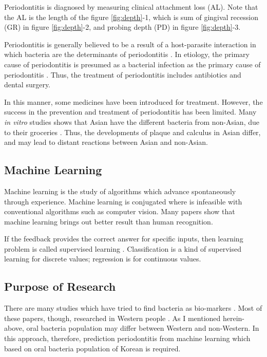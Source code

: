 \documentclass[aps, 11pt, a4paper]{article}
\begin{document}
    		Periodontitis is diagnosed by measuring clinical attachment loss (AL). Note that the AL is the length of the figure \ref{fig:depth}-1, which is sum of gingival recession (GR) in figure \ref{fig:depth}-2, and probing depth (PD) in figure \ref{fig:depth}-3.
    		
    		Periodontitis is generally believed to be a result of a host-parasite interaction in which bacteria are the determinants of periodontitis \cite{ref:cause1}. In etiology, the primary cause of periodontitis is presumed as a bacterial infection as the primary cause of periodontitis \cite{ref:perio1}. Thus, the treatment of periodontitis includes antibiotics and dental surgery.
    		
    		In this manner, some medicines have been introduced for treatment. However, the success in the prevention and treatment of periodontitis has been limited. Many \textit{in vitro} studies shows that Asian have the different bacteria from non-Asian, due to their groceries \cite{ref:asian1}. Thus, the developments of plaque and calculus in Asian differ, and may lead to distant reactions between Asian and non-Asian.
    		
    	\subsection{Machine Learning}
    		Machine learning is the study of algorithms which advance spontaneously through experience. Machine learning is conjugated where is infeasible with conventional algorithms such as computer vision.  Many papers show that machine learning brings out better result than human recognition. 
    	
    		If the feedback provides the correct answer for specific inputs, then learning problem is called supervised learning \cite{ref:ai1}. Classification is a kind of supervised learning for discrete values; regression is for continuous values.
    		
    	\subsection{Purpose of Research}
    		There are many studies which have tried to find bacteria as bio-markers \cite{ref:biomarker1, ref:biomarker2}. Most of these papers, though, researched in Western people \cite{ref:west1, ref:west2}. As I mentioned herein-above, oral bacteria population may differ between Western and non-Western. In this approach, therefore, prediction periodontitis from machine learning which based on oral bacteria population of Korean is required. 
    		
\end{document}
